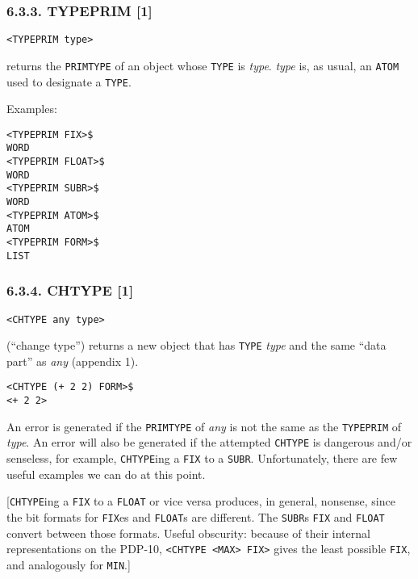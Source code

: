 \documentclass[a4paper,]{article}
\begin{document}
\subsubsection{6.3.3. TYPEPRIM {[}1{]}}\label{typeprim-1}

\begin{verbatim}
<TYPEPRIM type>
\end{verbatim}

 returns the \texttt{PRIMTYPE} of an object whose \texttt{TYPE} is \emph{type}. \emph{type}
is, as usual, an \texttt{ATOM} used to designate a \texttt{TYPE}.

Examples:

\begin{verbatim}
<TYPEPRIM FIX>$
WORD
<TYPEPRIM FLOAT>$
WORD
<TYPEPRIM SUBR>$
WORD
<TYPEPRIM ATOM>$
ATOM
<TYPEPRIM FORM>$
LIST
\end{verbatim}

\subsubsection{6.3.4. CHTYPE {[}1{]}}\label{chtype-1}

\begin{verbatim}
<CHTYPE any type>
\end{verbatim}

 (``change type'') returns a new object that has \texttt{TYPE} \emph{type} and the same
``data part'' as \emph{any} (appendix 1).

\begin{verbatim}
<CHTYPE (+ 2 2) FORM>$
<+ 2 2>
\end{verbatim}

An error is generated if the \texttt{PRIMTYPE} of \emph{any} is not the same as the \texttt{TYPEPRIM} of \emph{type}. An
error will also be generated if the attempted \texttt{CHTYPE} is dangerous and/or senseless, for example,
\texttt{CHTYPE}ing a \texttt{FIX} to a \texttt{SUBR}. Unfortunately, there are few useful examples we can do at this point.

{[}\texttt{CHTYPE}ing a \texttt{FIX} to a \texttt{FLOAT} or vice versa produces, in general, nonsense, since the bit
formats for \texttt{FIX}es and \texttt{FLOAT}s are different. The \texttt{SUBR}s \texttt{FIX} and \texttt{FLOAT} convert
between those formats. Useful obscurity: because of their internal representations on the PDP-10,
\texttt{\textless{}CHTYPE\ \textless{}MAX\textgreater{}\ FIX\textgreater{}} gives the least possible \texttt{FIX}, and
analogously for \texttt{MIN}.{]}
\end{document}

